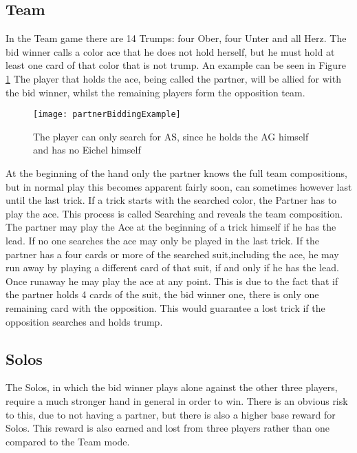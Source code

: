 \subsection{Team}
In the Team game there are 14 Trumps: four Ober, four Unter and all Herz.
\newline
The bid winner calls a color ace that he does not hold herself, but he must hold at least one card of that color
that is not trump.
An example can be seen in Figure \ref{fig:bidding}
The player that holds the ace, being called the partner, will be allied for with the bid winner, whilst the remaining
players form the opposition team.
\newline
\begin{figure}[h!]
    \texttt{[image: partnerBiddingExample]}\label{fig:figure}
    \caption{The player can only search for AS, since he holds the AG himself and has no Eichel himself}
    \label{fig:bidding}
\end{figure}
\newline
At the beginning of the hand only the partner knows the full team compositions, but in normal play this becomes
apparent fairly soon, can sometimes however last until the last trick.
If a trick starts with the searched color, the Partner has to play the ace.
This process is called Searching and reveals the team composition.
\newline
The partner may play the Ace at the beginning of a trick himself if he has the lead.
If no one searches the ace may only be played in the last trick.
If the partner has a four cards or more of the searched suit,including the ace, he may run away by playing a different
card of that suit, if and only if he has the lead.
Once runaway he may play the ace at any point.
This is due to the fact that if the partner holds 4 cards of the suit, the bid winner one, there is only one remaining
card with the opposition.
This would guarantee a lost trick if the opposition searches and holds trump.

\subsection{Solos}
The Solos, in which the bid winner plays alone against the other three players, require a much stronger hand in general
in order to win.
There is an obvious risk to this, due to not having a partner, but there is also a higher base reward for Solos.
This reward is also earned and lost from three players rather than one compared to the Team mode.

